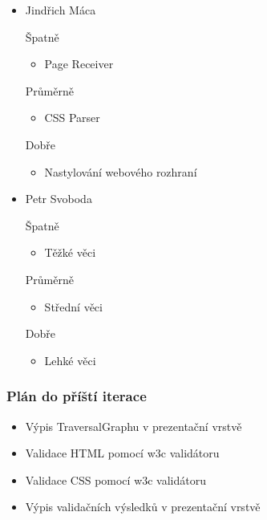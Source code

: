 \documentclass{beamer}
\begin{document}
\begin{frame}[allowframebreaks]
\begin{itemize}
    \item Jindřich Máca
      \begin{block}{Špatně} %
       \begin{itemize}
        \item Page Receiver
       \end{itemize}
     \end{block}
     \begin{block}{Průměrně} %
        \begin{itemize}
        \item CSS Parser
       \end{itemize}
     \end{block}
     \begin{block}{Dobře} %
       \begin{itemize}
        \item Nastylování webového rozhraní
       \end{itemize}
     \end{block}
   
    \item Petr Svoboda
      \begin{block}{Špatně} %
       \begin{itemize}
        \item Těžké věci
       \end{itemize}
     \end{block}
     \begin{block}{Průměrně} %
        \begin{itemize}
        \item Střední věci
       \end{itemize}
     \end{block}
     \begin{block}{Dobře} %
       \begin{itemize}
        \item Lehké věci
       \end{itemize}
     \end{block}
   \end{itemize}
\end{frame}

\begin{frame}[allowframebreaks]\frametitle{Plán do příští iterace}
  \begin{itemize}
    \item Výpis TraversalGraphu v prezentační vrstvě
		\item Validace HTML pomocí w3c validátoru
		\item Validace CSS pomocí w3c validátoru
		\item Výpis validačních výsledků v prezentační vrstvě
  \end{itemize}
\end{frame}
\end{document}
